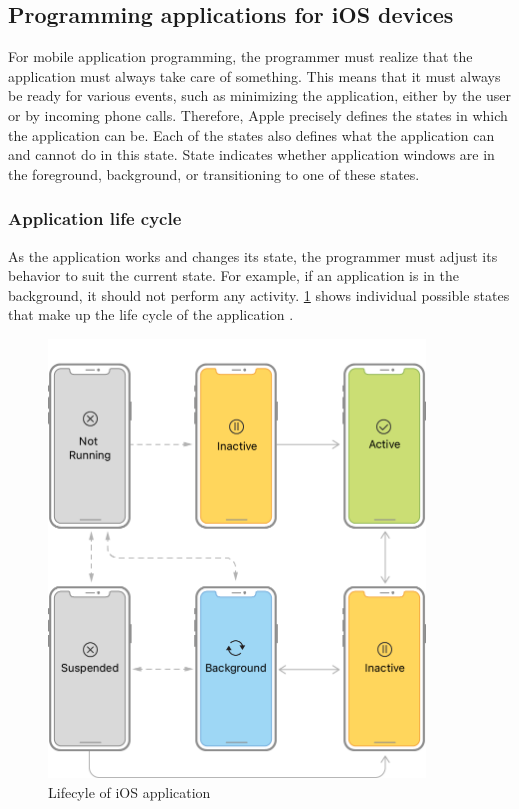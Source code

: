 \documentclass[
  biblatex = false,
  language=english,
  figures=false,
  sourcecodes,
  glossaries,
  index
]{kidiplom}
\begin{document}
\subsection{Programming applications for iOS devices}
For mobile application programming, the programmer must realize that the application must always take care of something. This means that it must always be ready for various events, such as minimizing the application, either by the user or by incoming phone calls. Therefore, Apple precisely defines the states in which the application can be. Each of the states also defines what the application can and cannot do in this state. State indicates whether application windows are in the foreground, background, or transitioning to one of these states.

\subsubsection{Application life cycle}
As the application works and changes its state, the programmer must adjust its behavior to suit the current state. For example, if an application is in the background, it should not perform any activity. \ref{fig:image2} shows individual possible states that make up the life cycle of the application \cite{bib4}.

\begin{figure}[h!]
\centering
\includegraphics[width=10cm]{image2}
\caption{Lifecyle of iOS application}
\label{fig:image2}
\end{figure}
\end{document}
